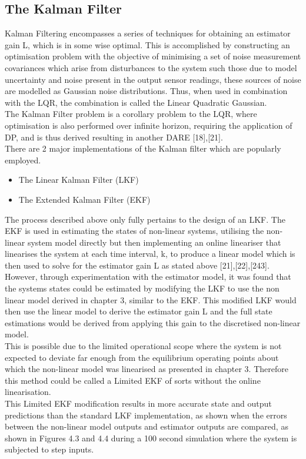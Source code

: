 \documentclass[12pt,a4paper,twoside]{report}
\begin{document}
			\subsection*{The Kalman Filter}
				
				Kalman Filtering encompasses a series of techniques for obtaining an estimator gain L, which is in some wise optimal. This is accomplished by constructing an optimisation problem with the objective of minimising a set of noise measurement covariances which arise from disturbances to the system such those due to model uncertainty and noise present in the output sensor readings, these sources of noise are modelled as Gaussian noise distributions. Thus, when used in combination with the LQR, the combination is called the Linear Quadratic Gaussian.  
				\\
				The Kalman Filter problem is a corollary problem to the LQR, where optimisation is also performed over infinite horizon, requiring the application of DP, and is thus derived resulting in another DARE [18],[21].
				\\
				There are 2 major implementations of the Kalman filter which are popularly employed.
					
				\begin{itemize}
					\item 
						The Linear Kalman Filter (LKF)
					\item 
						The Extended Kalman Filter (EKF)
				\end{itemize} 
				\space
				The process described above only fully pertains to the design of an LKF. The EKF is used in estimating the states of non-linear systems, utilising the non-linear system model directly but then implementing an online lineariser that linearises the system at each time interval, k, to produce a linear model which is then used to solve for the estimator gain L as stated above [21],[22],[243].
				\\
				However, through experimentation with the estimator model, it was found that the systems states could be estimated by modifying the LKF to use the non linear model derived in chapter 3, similar to the EKF. This modified LKF would then use the linear model to derive the estimator gain L and the full state estimations would be derived from applying this gain to the discretised non-linear model.
				\\
				This is possible due to the limited operational scope where the system is not expected to deviate far enough from the equilibrium operating points about which the non-linear model was linearised as presented in chapter 3. Therefore this method could be called a Limited EKF of sorts without the online linearisation.
				\\
				This Limited EKF modification results in more accurate state and output predictions than the standard LKF implementation, as shown when the errors between the non-linear model outputs and estimator outputs are compared, as shown in Figures 4.3 and 4.4 during a 100 second simulation where the system is subjected to step inputs. 
					
\end{document}
